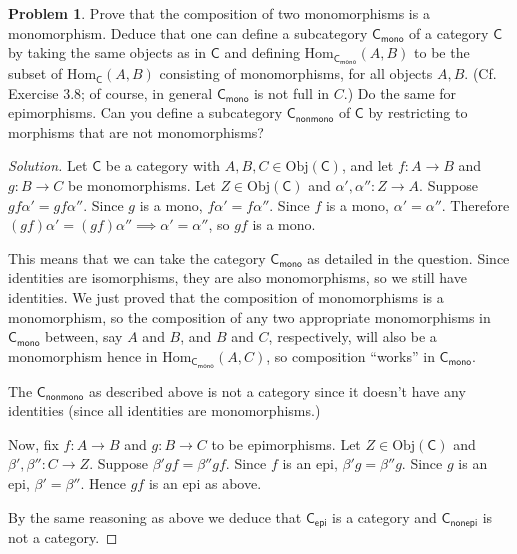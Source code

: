 \documentclass[fontsize=14pt]{scrartcl}
\theoremstyle{definition}
\newtheorem{problem-internal}{Problem}[subsection]
\newenvironment{problem}{
  \medskip
  \begin{problem-internal}
}{
  \end{problem-internal}
}
\newenvironment{solution}{
  \begin{proof}[Solution]
  \vspace{-8px}
  \setlength{\parskip}{4px}
  \setlength{\parindent}{0px}
}{
  \end{proof}
}
\newcommand{\Obj}{\mathrm{Obj}}
\newcommand{\Hom}{\mathrm{Hom}}
\begin{document}
\begin{problem}
\def \C {\mathsf{C}}
\def \mono {\mathsf{mono}}
\def \nonmono {\mathsf{nonmono}}

Prove that the composition of two monomorphisms is a monomorphism. Deduce that
one can define a subcategory $\C_\mono$ of a category $\C$ by taking the same
objects as in $\C$ and defining $\Hom_{\C_\mono}(A, B)$ to be the subset of
$\Hom_\C(A, B)$ consisting of monomorphisms, for all objects $A, B$. (Cf.
Exercise 3.8; of course, in general $\C_\mono$ is not full in $C$.) Do the same
for epimorphisms. Can you define a subcategory $\C_\nonmono$ of $\C$ by
restricting to morphisms that are not monomorphisms?
\end{problem}
\begin{solution}
\def \C {\mathsf{C}}
\def \mono {\mathsf{mono}}
\def \nonmono {\mathsf{nonmono}}
\def \epi {\mathsf{epi}}
\def \nonepi {\mathsf{nonepi}}

Let $\C$ be a category with $A,B,C\in \Obj(\C)$, and let $f:A\to B$ and $g:B\to
C$ be monomorphisms. Let $Z\in\Obj(\C)$ and $\alpha',\alpha'':Z\to A$. Suppose
$gf\alpha'=gf\alpha''$. Since $g$ is a mono, $f\alpha'=f\alpha''$. Since $f$ is
a mono, $\alpha'=\alpha''$. Therefore $(gf)\alpha'=(gf)\alpha'' \implies
\alpha'=\alpha''$, so $gf$ is a mono.

This means that we can take the category $\C_\mono$ as detailed in the question.
Since identities are isomorphisms, they are also monomorphisms, so we still have
identities. We just proved that the composition of monomorphisms is a
monomorphism, so the composition of any two appropriate monomorphisms in
$\C_\mono$ between, say $A$ and $B$, and $B$ and $C$, respectively, will also be
a monomorphism hence in $\Hom_{\C_\mono}(A,C)$, so composition ``works'' in
$\C_\mono$.

The $\C_\nonmono$ as described above is not a category since it doesn't have any
identities (since all identities are monomorphisms.)

Now, fix $f:A\to B$ and $g:B\to C$ to be epimorphisms. Let $Z\in\Obj(\C)$ and
$\beta',\beta'':C\to Z$. Suppose $\beta'gf=\beta''gf$. Since $f$ is an epi,
$\beta'g=\beta''g$. Since $g$ is an epi, $\beta'=\beta''$. Hence $gf$ is an epi
as above.

By the same reasoning as above we deduce that $\C_\epi$ is a category and
$\C_\nonepi$ is not a category.
\end{solution}
\end{document}
